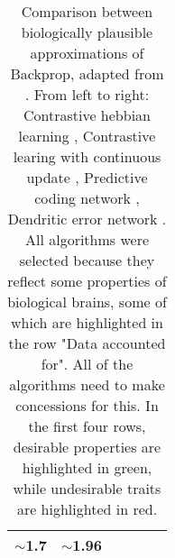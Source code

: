 \begin{table}[h]
{\begin{tabular}{|ll|ll|ll|}
               \multicolumn{1}{l|}{\cellcolor[HTML]{D9D9D9}$\sim$1.7}
               & $\sim$1.96
               \\
               \hline
    \end{tabular}
  }\caption[Comparison between biologically plausible approximations of Backprop]{Comparison between biologically
    plausible approximations of Backprop, adapted from \citep{whittington2019theories}. From left to right: Contrastive
    hebbian learning \citep{OReilly1996}, Contrastive learing with continuous update \citep{Bengio2017}, Predictive
    coding network \citep{Whittington2017}, Dendritic error network \citep{sacramento2018dendritic}. All algorithms were
    selected because they reflect some properties of biological brains, some of which are highlighted in the row "Data
    accounted for". All of the algorithms need to make concessions for this. In the first four rows, desirable
    properties are highlighted in green, while undesirable traits are highlighted in red.}\label{tab-wb-models}

\end{table}


